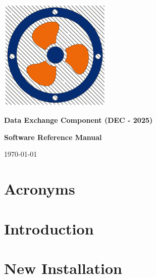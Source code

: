 \documentclass[
	oneside,
	openany,
	a4paper,
	headings=optiontoheadandtoc
	]{book}
\begin{document}

\begin{titlepage}
	\begin{center}
		
		\includegraphics[width=0.4\textwidth]{DEC_Logo_White.png}
		
		\vspace*{1cm}
		\Large
		\textbf{Data Exchange Component (DEC - 2025)}
		
		\textbf{Software Reference Manual}
		
		\vspace*{1cm}
		
		\vspace{0.8cm}
		
		\today
		
	\end{center}
\end{titlepage}
	


\tableofcontents
\newpage

\chapter{Acronyms}
 
\newpage
 
\chapter{Introduction}

\newpage

\chapter{New Installation}


%
\end{document}

